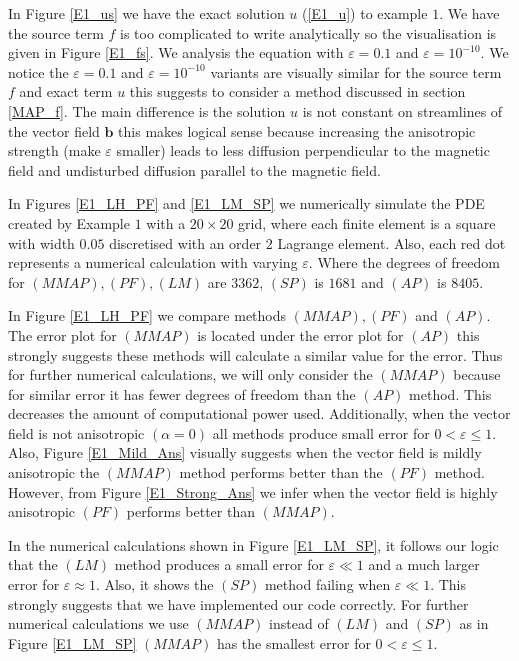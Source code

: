 \documentclass[12pt]{ociamthesis}
\begin{document}
In Figure \ref{E1_us} we have the exact solution $u$ (\ref{E1_u}) to example $1$. We have the source term $f$ is too complicated to write analytically so the visualisation is given in Figure \ref{E1_fs}. We analysis the equation with $\varepsilon = 0.1$ and $\varepsilon = 10^{-10}$. We notice the $\varepsilon = 0.1$ and $\varepsilon = 10^{-10}$ variants are visually similar for the source term $f$ and exact term $u$ this suggests to consider a method discussed in section \ref{MAP_f}. The main difference is the solution $u$ is not constant on streamlines of the vector field $\mathbf{b}$ this makes logical sense because increasing the anisotropic strength (make $\varepsilon$ smaller) leads to less diffusion perpendicular to the magnetic field and undisturbed diffusion parallel to the magnetic field.

In Figures \ref{E1_LH_PF} and \ref{E1_LM_SP} we numerically simulate the PDE created by Example $1$ with a $20 \times 20$ grid, where each finite element is a square with width $0.05$ discretised with an order $2$ Lagrange element. Also, each red dot represents a numerical calculation with varying $\varepsilon$. Where the degrees of freedom for $(MMAP), (PF), (LM)$ are $3362$, $(SP)$ is $1681$ and $(AP)$ is $8405$.

In Figure \ref{E1_LH_PF} we compare methods $(MMAP), (PF)$ and $(AP)$. The error plot for $(MMAP)$ is located under the error plot for $(AP)$ this strongly suggests these methods will calculate a similar value for the error. Thus for further numerical calculations, we will only consider the $(MMAP)$ because for similar error it has fewer degrees of freedom than the $(AP)$ method. This decreases the amount of computational power used. Additionally, when the vector field is not anisotropic $(\alpha = 0)$ all methods produce small error for $0 <\varepsilon \leq 1$. Also, Figure \ref{E1_Mild_Ans} visually suggests when the vector field is mildly anisotropic the $(MMAP)$ method performs better than the $(PF)$ method. However, from Figure \ref{E1_Strong_Ans} we infer when the vector field is highly anisotropic $(PF)$ performs better than $(MMAP)$. 

In the numerical calculations shown in Figure \ref{E1_LM_SP}, it follows our logic that the $(LM)$ method produces a small error for $\varepsilon \ll 1$ and a much larger error for $\varepsilon \approx 1$. Also, it shows the $(SP)$ method failing when $\varepsilon \ll 1$. This strongly suggests that we have implemented our code correctly. For further numerical calculations we use $(MMAP)$ instead of $(LM)$ and $(SP)$ as in Figure \ref{E1_LM_SP} $(MMAP)$ has the smallest error for  $0 < \varepsilon \leq 1$.
\end{document}
